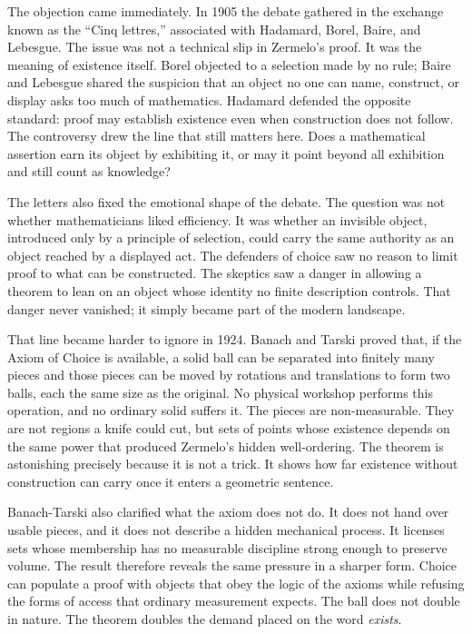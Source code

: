 The objection came immediately. In 1905 the debate gathered in the exchange
known as the ``Cinq lettres,'' associated with Hadamard, Borel, Baire, and
Lebesgue. The issue was not a technical slip in Zermelo's proof. It was the
meaning of existence itself. Borel objected to a selection made by no rule;
Baire and Lebesgue shared the suspicion that an object no one can name,
construct, or display asks too much of mathematics. Hadamard defended the
opposite standard: proof may establish existence even when construction does
not follow. The controversy drew the line that still matters here. Does a
mathematical assertion earn its object by exhibiting it, or may it point beyond
all exhibition and still count as knowledge?

The letters also fixed the emotional shape of the debate. The question was not
whether mathematicians liked efficiency. It was whether an invisible object,
introduced only by a principle of selection, could carry the same authority as
an object reached by a displayed act. The defenders of choice saw no reason to
limit proof to what can be constructed. The skeptics saw a danger in allowing a
theorem to lean on an object whose identity no finite description controls.
That danger never vanished; it simply became part of the modern landscape.

That line became harder to ignore in 1924. Banach and Tarski proved that, if
the Axiom of Choice is available, a solid ball can be separated into finitely
many pieces and those pieces can be moved by rotations and translations to form
two balls, each the same size as the original. No physical workshop performs
this operation, and no ordinary solid suffers it. The pieces are
non-measurable. They are not regions a knife could cut, but sets of points
whose existence depends on the same power that produced Zermelo's hidden
well-ordering. The theorem is astonishing precisely because it is not a trick.
It shows how far existence without construction can carry once it enters a
geometric sentence.

Banach-Tarski also clarified what the axiom does not do. It does not hand over
usable pieces, and it does not describe a hidden mechanical process. It
licenses sets whose membership has no measurable discipline strong enough to
preserve volume. The result therefore reveals the same pressure in a sharper
form. Choice can populate a proof with objects that obey the logic of the
axioms while refusing the forms of access that ordinary measurement expects.
The ball does not double in nature. The theorem doubles the demand placed on
the word \emph{exists}.

